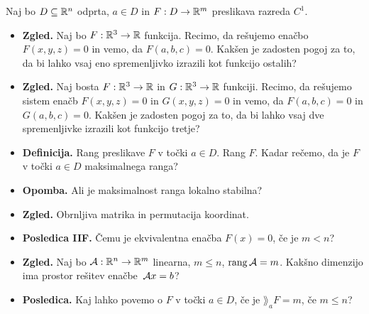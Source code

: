 \begin{enumerate}
    Naj bo $D \subseteq \mathbb{R}^n$ odprta, $a \in D$ in $F: D \to \mathbb{R}^m$ preslikava razreda $C^1$.
    \begin{itemize}
        \item \textbf{Zgled.} Naj bo $F: \mathbb{R}^3 \to \mathbb{R}$ funkcija. Recimo, da rešujemo enačbo $F(x,y,z) = 0$ in vemo, da $F(a,b,c) = 0$. Kakšen je zadosten pogoj za to, da bi lahko vsaj eno spremenljivko izrazili kot funkcijo ostalih?
        \item \textbf{Zgled.} Naj bosta $F: \mathbb{R}^3 \to \mathbb{R}$ in $G: \mathbb{R}^3 \to \mathbb{R}$ funkciji. Recimo, da rešujemo sistem enačb $F(x,y,z) = 0$ in $G(x,y,z) = 0$ in vemo, da  $F(a,b,c) = 0$ in  $G(a,b,c) = 0$. Kakšen je zadosten pogoj za to, da bi lahko vsaj dve spremenljivke izrazili kot funkcijo tretje?
        \item \textbf{Definicija.} Rang preslikave $F$ v točki $a \in D$. Rang $F$. Kadar rečemo, da je $F$ v točki $a \in D$ maksimalnega ranga?
        \item \textbf{Opomba.} Ali je maksimalnost ranga lokalno stabilna?
        \item \textbf{Zgled.} Obrnljiva matrika in permutacija koordinat.
        \item \textbf{Posledica IIF.} Čemu je ekvivalentna enačba $F(x) = 0$, če je $m < n$?
        \item \textbf{Zgled.} Naj bo $\mathcal{A}: \mathbb{R}^n \to \mathbb{R}^m$ linearna, $m \leq n$, $\operatorname{rang} \mathcal{A} = m$. Kakšno dimenzijo ima prostor rešitev enačbe~$\mathcal{A}x=b$?
        \item \textbf{Posledica.} Kaj lahko povemo o $F$ v točki $a \in D$, če je $\rang_a F = m$, če $m \leq n$?
    \end{itemize}
\end{enumerate}

